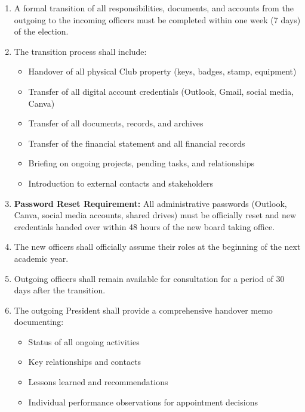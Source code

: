 
\begin{enumerate}[label=\alph*), leftmargin=2em, itemsep=0.3em]
    \item A formal transition of all responsibilities, documents, and accounts from the outgoing to the incoming officers must be completed within one week (7 days) of the election.
    
    \item The transition process shall include:
    \begin{itemize}[leftmargin=1.5em, itemsep=0.2em]
        \item Handover of all physical Club property (keys, badges, stamp, equipment)
        \item Transfer of all digital account credentials (Outlook, Gmail, social media, Canva)
        \item Transfer of all documents, records, and archives
        \item Transfer of the financial statement and all financial records
        \item Briefing on ongoing projects, pending tasks, and relationships
        \item Introduction to external contacts and stakeholders
    \end{itemize}
    
    \item \textbf{Password Reset Requirement:} All administrative passwords (Outlook, Canva, social media accounts, shared drives) must be officially reset and new credentials handed over within 48 hours of the new board taking office.
    
    \item The new officers shall officially assume their roles at the beginning of the next academic year.
    
    \item Outgoing officers shall remain available for consultation for a period of 30 days after the transition.
    
    \item The outgoing President shall provide a comprehensive handover memo documenting:
    \begin{itemize}[leftmargin=1.5em, itemsep=0.2em]
        \item Status of all ongoing activities
        \item Key relationships and contacts
        \item Lessons learned and recommendations
        \item Individual performance observations for appointment decisions
    \end{itemize}
\end{enumerate}

